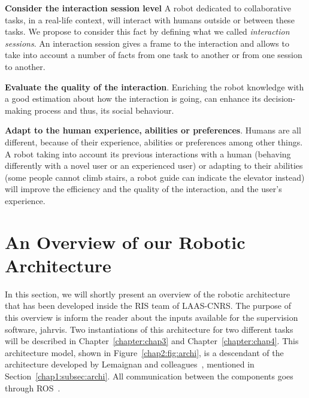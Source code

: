 \documentclass[a4paper,11pt,twoside]{StyleThese}
\begin{document}
\begin{bulletList}
	\item \textbf{Consider the interaction session level} A robot dedicated to collaborative tasks, in a real-life context, will interact with humans outside or between these tasks. We propose to consider this fact by defining what we called \textit{interaction sessions}. An interaction session gives a frame to the interaction and allows to take into account a number of facts from one task to another or from one session to another.
	\item \textbf{Evaluate the quality of the interaction}. Enriching the robot knowledge with a good estimation about how the interaction is going, can enhance its decision-making process and thus, its social behaviour.
	\item \textbf{Adapt to the human experience, abilities or preferences}. Humans are all different, because of their experience, abilities or preferences among other things. A robot taking into account its previous interactions with a human (\eg behaving differently with a novel user or an experienced user) or adapting to their abilities (\eg some people cannot climb stairs, a robot guide can indicate the elevator instead) will improve the efficiency and the quality of the interaction, and the user's experience.
\end{bulletList}


\section{An Overview of our Robotic Architecture}\label{chap2:sec:rob_archi}

In this section, we will shortly present an overview of the robotic architecture that has been developed inside the RIS team of LAAS-CNRS. The purpose of this overview is inform the reader about the inputs available for the supervision software, \acrshort{jahrvis}. Two instantiations of this architecture for two different tasks will be described in Chapter~\ref{chapter:chap3} and Chapter~\ref{chapter:chap4}. This architecture model, shown in Figure~\ref{chap2:fig:archi}, is a descendant of the architecture developed by Lemaignan and colleagues~\cite{lemaignan_2017_artificial}, mentioned in Section~\ref{chap1:subsec:archi}. All communication between the components goes through ROS~\cite{quigley_2009_ros}.
\end{document}
